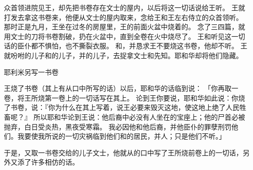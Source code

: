 {\par }{\PP {}众首领进院见王，却先把书卷存在文士{}的屋内，以后将这一切话说给王听。
王就打发{}去拿这书卷来，他便从文士{}的屋内取来，念给王和王左右侍立的众首领听。
那时正是九月，王坐在过冬的房屋里，王的前面火盆中{}烧着的{}。
念了三四篇，{}就用文士的刀将书卷割破，扔在火盆中，直到全卷在火中烧尽了。
王和听见这一切话的臣仆都不惧怕，也不撕裂衣服。
和{}，并{}恳求王不要烧这书卷，他却不听。
王就吩咐{}的儿子和{}的儿子{}，并{}的儿子{}，去捉拿文士{}和先知{}。耶和华却将他们隐藏。
\par }{\SH 耶利米另写一书卷
\par }{\PP {}王烧了书卷（其上有{}从{}口中所写的话）以后，耶和华的话临到{}说：
「你再取一卷，将{}王{}所烧第一卷上的一切话写在其上。
论到{}王{}你要说，耶和华如此说：你烧了书卷，说：『你为什么在其上写着，说{}王必要来毁灭这地，使这地上绝了人民牲畜呢？』
所以耶和华论到{}王{}说：他后裔中必没有人坐在{}的宝座上；他的尸首必被抛弃，白日受炎热，黑夜受寒霜。
我必因他和他后裔，并他臣仆的罪孽刑罚他们。我要使我所说的一切灾祸临到他们和{}的居民，并{}人；只是他们不听。」
\par }{\PP {}于是，{}又取一书卷交给{}的儿子文士{}，他就从{}的口中写了{}王{}所烧前卷上的一切话，另外又添了许多相仿的话。

}

